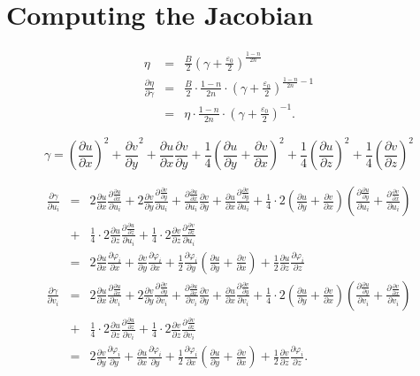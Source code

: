 \documentclass{article}
\begin{document}
\section{Computing the Jacobian}
\label{sec:jacobian}

\newcommand{\diff}[2]{\frac{\partial {#1}}{\partial {#2}}}
\newcommand{\dphi}[2][i]{\diff{\varphi_{#1}}{#2}}
\newcommand{\exponent}{\frac{1-n}{2n}}

\newcommand{\dux}{\diff{u}{x}}
\newcommand{\duy}{\diff{u}{y}}
\newcommand{\duz}{\diff{u}{z}}
\newcommand{\dvx}{\diff{v}{x}}
\newcommand{\dvy}{\diff{v}{y}}
\newcommand{\dvz}{\diff{v}{z}}
\newcommand{\deta}{\diff{\eta}{\gamma}}
\newcommand{\jw}{|J|\,w}
\newcommand{\dgdu}{\diff{\gamma}{u}}
\newcommand{\dgdv}{\diff{\gamma}{v}}
\newcommand{\p}[1]{\left(#1\right)}

\begin{eqnarray}
  \label{eq:3}
  \eta &=& \frac{B}{2} \p{\gamma + \frac{\varepsilon_{0}}{2}}^{\exponent}\\
  \diff{\eta}{\gamma} &=& \frac{B}{2} \cdot \exponent \cdot \p{\gamma + \frac{\varepsilon_{0}}{2} }^{\exponent-1}\\
  &=& \eta \cdot \exponent \cdot \p{\gamma + \frac{\varepsilon_{0}}{2} }^{-1}.
\end{eqnarray}

\begin{equation}
  \label{eq:2}
  \gamma = \p{\dux}^{2} + \dvy^{2} + \dux \dvy + \frac14 \p{\duy + \dvx}^{2} + \frac14 \p{\duz}^{2} + \frac14 \p{\dvz}^{2}
\end{equation}

\begin{eqnarray}
  \label{eq:1}
  \diff{\gamma}{u_{i}} &=& 2\dux \diff{\dux}{u_{i}} + 2\dvy \diff{\dvy}{u_{i}} + \diff{\dux}{u_{i}}\dvy + \dux\diff{\dvy}{u_{i}}
  +\frac 14 \cdot 2 \p{\duy + \dvx}\p{\diff{\duy}{u_{i}} + \diff{\dvx}{u_{i}} }\\
  &+& \frac 14 \cdot 2 \duz \diff{\duz}{u_{i}}
  + \frac 14 \cdot 2 \dvz \diff{\dvz}{u_{i}} \nonumber\\
  &=& 2\dux\dphi{x} + \dvy\dphi{x} + \frac 12 \dphi{y}\p{\duy + \dvx} + \frac 12 \duz \dphi{z}\\
  \diff{\gamma}{v_{i}} &=& 2\dux \diff{\dux}{v_{i}} + 2\dvy \diff{\dvy}{v_{i}} + \diff{\dux}{v_{i}}\dvy + \dux\diff{\dvy}{v_{i}}
  +\frac 14 \cdot 2 \p{\duy + \dvx}\p{\diff{\duy}{v_{i}} + \diff{\dvx}{v_{i}} }\\
  &+& \frac 14 \cdot 2 \duz \diff{\duz}{v_{i}} + \frac 14 \cdot 2 \dvz \diff{\dvz}{v_{i}} \nonumber\\
  &=& 2\dvy\dphi{y} + \dux\dphi{y} + \frac 12 \dphi{x}\p{\duy + \dvx} + \frac 12 \dvz \dphi{z}.
\end{eqnarray}
\end{document}
